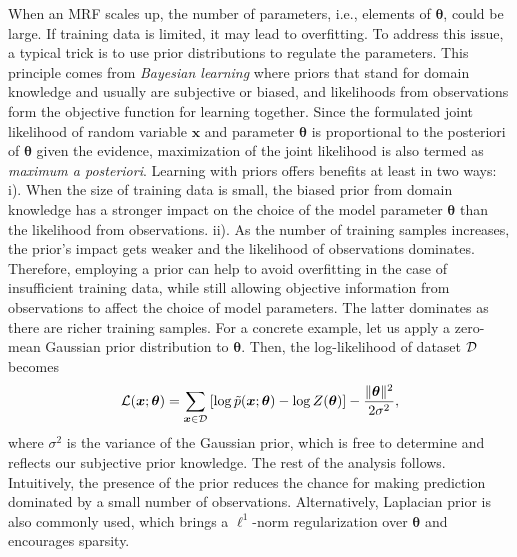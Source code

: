 \begin{remark}
  When an MRF scales up, the number of parameters, i.e., elements of $\bm{\theta}$, could be large. If training data is limited, it may lead to overfitting. To address this issue, a typical trick is to use prior distributions to regulate the parameters. This principle comes from \textit{Bayesian learning} where priors that stand for domain knowledge and usually are subjective or biased, and likelihoods from observations form the objective function for learning together. Since the formulated joint likelihood of random variable $\bm{x}$ and parameter $\bm{\theta}$ is proportional to the posteriori of $\bm{\theta}$ given the evidence, maximization of the joint likelihood is also termed as \textit{maximum a posteriori}. Learning with priors offers benefits at least in two ways: i). When the size of training data is small, the biased prior from domain knowledge has a stronger impact on the choice of the model parameter $\bm{\theta}$ than the likelihood from observations. ii). As the number of training samples increases, the prior's impact gets weaker and the likelihood of observations dominates. Therefore, employing a prior can help to avoid overfitting in the case of insufficient training data, while still allowing objective information from observations to affect the choice of model parameters. The latter dominates as there are richer training samples. For a concrete example, let us apply a zero-mean Gaussian prior distribution to $\bm{\theta}$. Then, the log-likelihood of dataset $\mathcal{D}$ becomes 
  \begin{equation}
    \mathcal{L}(\bm{x};\bm{\theta}) = \sum_{\bm{x}\in \mathcal{D}}\left[ \log{\tilde{p}(\bm{x}; \bm{\theta})} - \log{Z(\bm{\theta})}  \right] - \frac{\| \bm{\theta} \|^2}{2\sigma^2},
  \end{equation}
  where $\sigma^2$ is the variance of the Gaussian prior, which is free to determine and reflects our subjective prior knowledge. The rest of the analysis follows. Intuitively, the presence of the prior reduces the chance for making prediction dominated by a small number of observations. 
Alternatively, Laplacian prior is also commonly used, which brings a $\ell^1$-norm regularization over $\bm{\theta}$ and encourages sparsity.

\end{remark}

